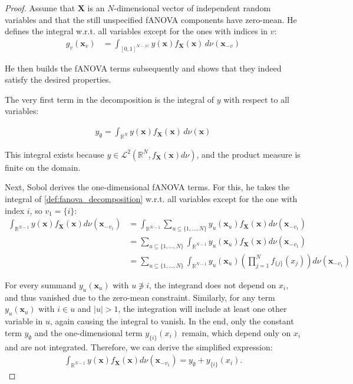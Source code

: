 \begin{proof}
    Assume that $\boldsymbol{X}$ is an $N$-dimensional vector of independent random variables and
    that the still unspecified fANOVA components have zero-mean. He defines the integral w.r.t. all variables except for the ones with indices in \( v \):
    \begin{align*}
        g_v(\boldsymbol{x}_v) &= \int_{[0, 1]^{N - |v|}} y(\boldsymbol{x}) f_{\boldsymbol{X}}(\boldsymbol{x}) \, d\nu (\boldsymbol{x}_{-v})
    \end{align*}

He then builds the fANOVA terms subsequently and shows that they indeed satisfy the desired properties.\par
The very first term in the decomposition is the integral of \( y \) with respect to all variables:

\begin{align*}
    y_{\emptyset} = \int_{\mathbb{R}^N} y(\boldsymbol{x}) f_{\boldsymbol{X}}(\boldsymbol{x}) \, d\nu(\boldsymbol{x})
\end{align*}

This integral exists because \( y \in \mathcal{L}^2(\mathbb{R}^N, f_{\boldsymbol{X}}(\boldsymbol{x}) d\nu) \), and the product measure is finite on the domain.

Next, Sobol derives the one-dimensional fANOVA terms. For this, he takes the integral of \autoref{def:fanova_decomposition} w.r.t. all variables except for the one with index \( i \), so $v_1 = \{i\}$:
\begin{align*}
    \int_{\mathbb{R}^{N-1}} y(\boldsymbol{x}) f_{\boldsymbol{X}}(\boldsymbol{x}) d\nu (\boldsymbol{x}_{-v_1}) 
    &= \int_{\mathbb{R}^{N-1}} \sum_{u \subseteq \{1, \dots, N\}} y_{u}(\boldsymbol{x}_u) f_{\boldsymbol{X}}(\boldsymbol{x}) d\nu (\boldsymbol{x}_{-v_1}) \\
    &= \sum_{u \subseteq \{1, \dots, N\}} \int_{\mathbb{R}^{N-1}} y_{u}(\boldsymbol{x}_u) f_{\boldsymbol{X}}(\boldsymbol{x}) d\nu (\boldsymbol{x}_{-v_1}) \\
    &= \sum_{u \subseteq \{1, \dots, N\}} \int_{\mathbb{R}^{N-1}} y_{u}(\boldsymbol{x}_u) \left( \prod_{j=1}^N f_{{\{j\}}}(x_j) \right) d\nu (\boldsymbol{x}_{-v_1})
\end{align*}

For every summand \( y_u(\boldsymbol{x}_u) \) with \( u \not\ni i \), the integrand does not depend on \( x_i \), and thus vanished due to the zero-mean constraint.
Similarly, for any term \( y_u(\boldsymbol{x}_u) \) with \( i \in u \) and \( |u| > 1 \), the integration will include at least one other variable in \( u \), again causing the integral to vanish.
In the end, only the constant term \( y_{\emptyset} \) and the one-dimensional term \( y_{\{i\}}(x_i) \) remain, which depend only on \( x_i \) and are not integrated.
Therefore, we can derive the simplified expression:
\begin{align*}
    \int_{\mathbb{R}^{N-1}} y(\boldsymbol{x}) f_{\boldsymbol{X}}(\boldsymbol{x}) d\nu (\boldsymbol{x}_{-v_1}) = y_{\emptyset} + y_{\{i\}}(x_i).
\end{align*}


\end{proof}
